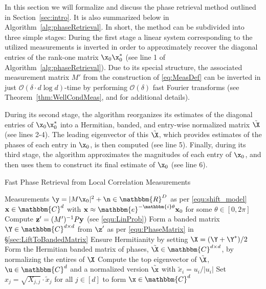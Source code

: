
In this section we will formalize and discuss the phase retrieval method outlined in Section~\ref{sec:intro}.  It is also summarized below in Algorithm~\ref{alg:phaseRetrieval}.  In short, the method can be subdivided into three simple stages:  During the first stage a linear system corresponding to the utilized measurements is inverted in order to approximately recover the diagonal entries of the rank-one matrix $\x_0 \x^*_0$ (see line 1 of Algorithm~\ref{alg:phaseRetrieval}).  Due to its special structure, the associated measurement matrix $M'$ from the construction of \eqref{eq:MeasDef} can be inverted in just $\mathcal{O} \left( \delta \cdot d \log d \right)$-time by performing $\mathcal{O(\delta)}$ fast Fourier transforms (see Theorem~\ref{thm:WellCondMeas}, and \cite{IVW2015_FastPhase} for additional details).  

During its second stage, the algorithm reorganizes its estimates of the diagonal entries of $\x_0 \x^*_0$ into a Hermitian, banded, and entry-wise normalized matrix $\tilde{\X}$ (see lines 2-4).  The leading eigenvector of this $\tilde{\X}$, which provides estimates of the phases of each entry in $\x_0$, is then computed (see line 5).  Finally, during its third stage, the algorithm approximates the magnitudes of each entry of $\x_0$, and then uses them to construct its final estimate of $\x_0$ (see line 6).

\begin{algorithm}
\renewcommand{\algorithmicrequire}{\textbf{Input:}}
\renewcommand{\algorithmicensure}{\textbf{Output:}}
\caption{Fast Phase Retrieval from Local Correlation Measurements}
\label{alg:phaseRetrieval}
\begin{algorithmic}[1]
    \REQUIRE Measurements $\y = |  M \x_0 |^2 + \n \in \mathbbm{R}^D$ as per \eqref{equ:shift_model}
    \ENSURE ${\bf x} \in \mathbbm{C}^d$ with ${\bf x} \approx \mathbbm{e}^{-\mathbbm{i} \theta} {\bf x}_0$ for some $\theta \in [0, 2 \pi]$ 
    \STATE Compute ${\bf z}' = (M')^{-1} P {\bf y}$ (see \eqref{equ:LinProb}) %
    \STATE Form a banded matrix $\Y \in \mathbbm{C}^{d \times d}$ from $\z'$ as per \eqref{equ:PhaseMatrix} in \S\ref{sec:LiftToBandedMatrix}
    \STATE Ensure Hermitianity by setting $\X = (\Y + \Y^*) / 2$
    \STATE Form the Hermitian banded matrix of phases, $\tilde{\X} \in \mathbbm{C}^{d \times d}$, by normalizing the entires of $\X$ %
    \STATE Compute the top eigenvector of $\tilde{\X}$, $\u \in \mathbbm{C}^d$ and a normalized version $\tilde{\x}$ with $\tilde{x}_i = u_i / |u_i|$
    \STATE Set $x_j = \sqrt{X_{j,j}} \cdot \tilde{x}_j$ for all $j \in [d]$ to form $\x \in \mathbbm{C}^d$
    \end{algorithmic}
\end{algorithm}


